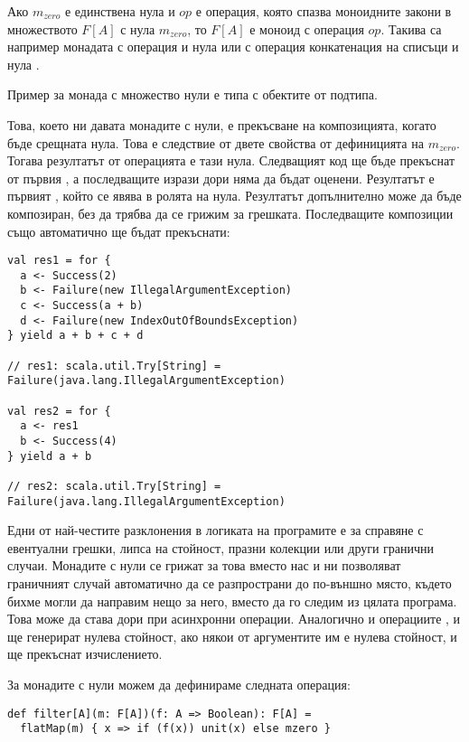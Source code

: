 Ако $m_{zero}$ е единствена нула и $op$ е операция, която спазва моноидните закони в множеството $F[A]$ с нула $m_{zero}$, то $F[A]$ е моноид с операция $op$. Такива са например монадата  с операция  и нула  или  с операция конкатенация на списъци и нула .

Пример за монада с множество нули е типа  с обектите от  подтипа.

Това, което ни давата монадите с нули, е прекъсване на композицията, когато бъде срещната нула. Това е следствие от двете свойства от дефиницията на $m_{zero}$. Тогава резултатът от операцията е тази нула. Следващият код ще бъде прекъснат от първия , а последващите изрази дори няма да бъдат оценени. Резултатът е първият , който се явява в ролята на нула. Резултатът допълнително може да бъде композиран, без да трябва да се грижим за грешката. Последващите композиции също автоматично ще бъдат прекъснати:

\begin{lstlisting}
val res1 = for {
  a <- Success(2)
  b <- Failure(new IllegalArgumentException)
  c <- Success(a + b)
  d <- Failure(new IndexOutOfBoundsException)
} yield a + b + c + d

// res1: scala.util.Try[String] = Failure(java.lang.IllegalArgumentException)

val res2 = for {
  a <- res1
  b <- Success(4)
} yield a + b

// res2: scala.util.Try[String] = Failure(java.lang.IllegalArgumentException)
\end{lstlisting}

Едни от най-честите разклонения в логиката на програмите е за справяне с евентуални грешки, липса на стойност, празни колекции или други гранични случаи. Монадите с нули се грижат за това вместо нас и ни позволяват граничният случай автоматично да се разпространи до по-външно място, където бихме могли да направим нещо за него, вместо да го следим из цялата програма. Това може да става дори при асинхронни операции. Аналогично и операциите ,  и  ще генерират нулева стойност, ако някои от аргументите им е нулева стойност, и ще прекъснат изчислението.

За монадите с нули можем да дефинираме следната операция:

\begin{lstlisting}
def filter[A](m: F[A])(f: A => Boolean): F[A] =
  flatMap(m) { x => if (f(x)) unit(x) else mzero }
\end{lstlisting}

